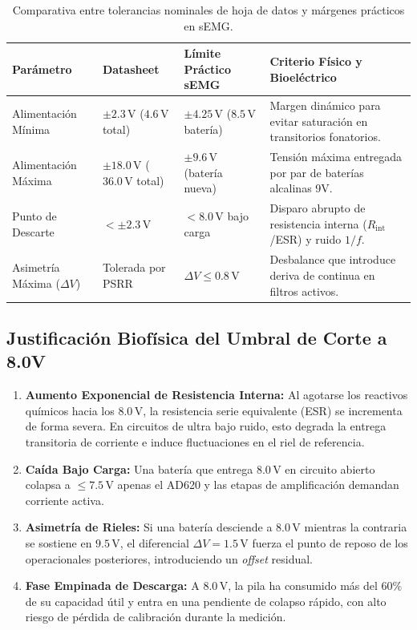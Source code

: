 \documentclass[11pt,a4paper]{article}
\begin{document}
\begin{table}[H]
\centering
\small
\begin{tabularx}{\textwidth}{l p{3.2cm} p{3.2cm} X}
\toprule
\textbf{Parámetro} & \textbf{Datasheet} & \textbf{Límite Práctico sEMG} & \textbf{Criterio Físico y Bioeléctrico} \\
\midrule
Alimentación Mínima & $\pm 2.3\,\text{V}$ ($4.6\,\text{V}$ total) & $\pm 4.25\,\text{V}$ ($8.5\,\text{V}$ batería) & Margen dinámico para evitar saturación en transitorios fonatorios. \\
Alimentación Máxima & $\pm 18.0\,\text{V}$ ($36.0\,\text{V}$ total) & $\pm 9.6\,\text{V}$ (batería nueva) & Tensión máxima entregada por par de baterías alcalinas 9V. \\
Punto de Descarte & $< \pm 2.3\,\text{V}$ & $< 8.0\,\text{V}$ bajo carga & Disparo abrupto de resistencia interna ($R_{\text{int}}$/ESR) y ruido $1/f$. \\
Asimetría Máxima ($\Delta V$) & Tolerada por PSRR & $\Delta V \le 0.8\,\text{V}$ & Desbalance que introduce deriva de continua en filtros activos. \\
\bottomrule
\end{tabularx}
\caption{Comparativa entre tolerancias nominales de hoja de datos y márgenes prácticos en sEMG.}
\label{tab:baterias}
\end{table}

\subsection{Justificación Biofísica del Umbral de Corte a 8.0V}
\begin{enumerate}
    \item \textbf{Aumento Exponencial de Resistencia Interna:} Al agotarse los reactivos químicos hacia los $8.0\,\text{V}$, la resistencia serie equivalente (ESR) se incrementa de forma severa. En circuitos de ultra bajo ruido, esto degrada la entrega transitoria de corriente e induce fluctuaciones en el riel de referencia.
    \item \textbf{Caída Bajo Carga:} Una batería que entrega $8.0\,\text{V}$ en circuito abierto colapsa a $\le 7.5\,\text{V}$ apenas el AD620 y las etapas de amplificación demandan corriente activa.
    \item \textbf{Asimetría de Rieles:} Si una batería desciende a $8.0\,\text{V}$ mientras la contraria se sostiene en $9.5\,\text{V}$, el diferencial $\Delta V = 1.5\,\text{V}$ fuerza el punto de reposo de los operacionales posteriores, introduciendo un \textit{offset} residual.
    \item \textbf{Fase Empinada de Descarga:} A $8.0\,\text{V}$, la pila ha consumido más del $60\%$ de su capacidad útil y entra en una pendiente de colapso rápido, con alto riesgo de pérdida de calibración durante la medición.
\end{enumerate}
\end{document}
